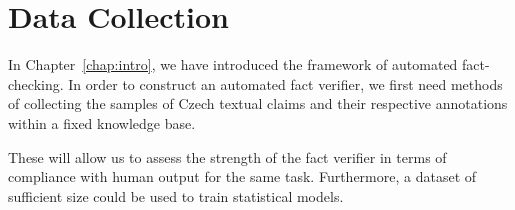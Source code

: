 
\chapter{Data Collection}
\label{chap:collection}
In Chapter~\ref{chap:intro}, we have introduced the framework of automated fact-checking. In order to construct an automated fact verifier, we first need methods of collecting the samples of Czech textual claims and their respective annotations within a fixed knowledge base.

These will allow us to assess the strength of the fact verifier in terms of compliance with human output for the same task. Furthermore, a dataset of sufficient size could be used to train statistical models.


